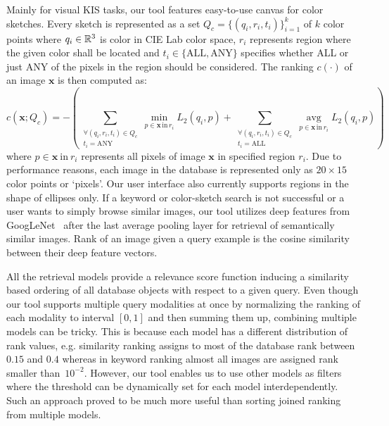 Mainly for visual KIS tasks, our tool features easy-to-use canvas for color sketches. Every sketch is represented as a set $Q_c = \{\left(q_i, r_i, t_i\right)\}^k_{i=1}$ of $k$ color points where $q_i\in\mathbb{R}^3$ is color in CIE Lab color space, $r_i$ represents region where the given color shall be located and $t_i\in \{\mathrm{ALL},\mathrm{ANY}\}$ specifies whether ALL or just ANY of the pixels in the region should be considered. The ranking $c(\cdot)$ of an image $\bm{x}$ is then computed as:
\begin{equation}
c\left(\bm{x}; Q_c\right) =-\left(\sum\limits_{\substack{\forall \left(q_i,r_i,t_i\right) \in Q_c\\t_i=\mathrm{ANY}}} \min\limits_{p\in\bm{x}\,\mathrm{in}\,r_i}L_2\left(q_i, p\right)+\sum\limits_{\substack{\forall \left(q_i,r_i,t_i\right) \in Q_c\\t_i=\mathrm{ALL}}} \mathop{\mathrm{avg}}\limits_{p\in\bm{x}\,\mathrm{in}\,r_i}L_2\left(q_i, p\right)\right)
\end{equation}
where $p\in\bm{x}\ \mathrm{in}\ r_i$ represents all pixels of image $\bm{x}$ in specified region $r_i$. Due to performance reasons, each image in the database is represented only as $20\times 15$ color points or `pixels'. Our user interface also currently supports regions in the shape of ellipses only. If a keyword or color-sketch search is not successful or a user wants to simply browse similar images, our tool utilizes deep features from GoogLeNet~\cite{szegedy2015going} after the last average pooling layer for retrieval of semantically similar images. Rank of an image given a query example is the cosine similarity between their deep feature vectors.


All the retrieval models provide a relevance score function inducing a similarity based ordering of all database objects with respect to a given query. Even though our tool supports multiple query modalities at once by normalizing the ranking of each modality to interval $[0, 1]$ and then summing them up, combining multiple models can be tricky. This is because each model has a different distribution of rank values, e.g. similarity ranking assigns to most of the database rank between $0.15$ and $0.4$ whereas in keyword ranking almost all images are assigned rank smaller than~$10^{-2}$. However, our tool enables us to use other models as filters where the threshold can be dynamically set for each model interdependently. Such an approach proved to be much more useful than sorting joined ranking from multiple models.

